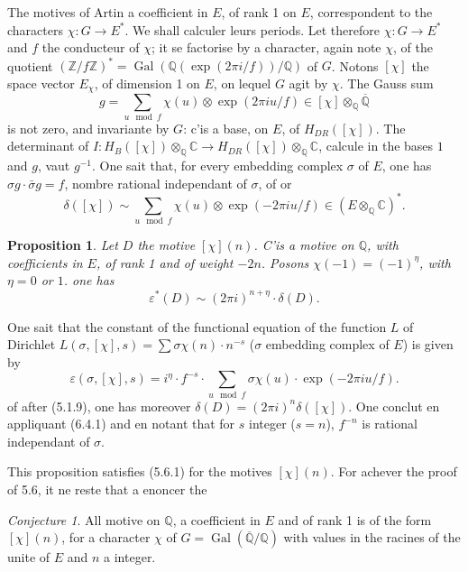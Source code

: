 \documentclass[12pt,a4paper]{article}
\theoremstyle{plain}
\newtheorem{proposition}[theorem]{Proposition}
\theoremstyle{definition}
\theoremstyle{remark}
\newtheorem{conjecture}[definition]{Conjecture}
\DeclareMathOperator{\Gal}{Gal}
\newcommand{\Q}{\mathbb{Q}}
\newcommand{\C}{\mathbb{C}}
\newcommand{\Z}{\mathbb{Z}}
\begin{document}
The motives of Artin a coefficient in $E$, of rank 1 on $E$, correspondent to the
characters $\chi: G \to E^*$. We shall calculer leurs periods. Let therefore
$\chi: G \to E^*$ and $f$ the conducteur of $\chi$; it se factorise by a character, again note
$\chi$, of the quotient $(\Z/f\Z)^* = \Gal(\Q(\exp(2\pi i/f))/\Q)$ of $G$. Notons $[\chi]$ the space
vector $E_\chi$, of dimension 1 on $E$, on lequel $G$ agit by $\chi$. The Gauss sum
\[
g = \sum_{u \mod f} \chi(u) \otimes \exp(2\pi i u/f) \in [\chi] \otimes_\Q \overline{\Q}
\]
is not zero, and invariante by $G$: c'is a base, on $E$, of $H_{DR}([\chi])$. The
determinant of $I: H_B([\chi]) \otimes_\Q \C \to H_{DR}([\chi]) \otimes_\Q \C$, calcule in the bases
$1$ and $g$, vaut $g^{-1}$. One sait that, for every embedding complex $\sigma$ of $E$, one has
$\sigma g \cdot \bar{\sigma} g = f$, nombre rational independant of $\sigma$, of or
\begin{equation}\label{eq:6.4.1}
\delta([\chi]) \sim \sum_{u \mod f} \chi(u) \otimes \exp(-2\pi i u/f) \in (E \otimes_\Q \C)^*.
\end{equation}

\begin{proposition}\label{prop:6.5}
Let $D$ the motive $[\chi](n)$. C'is a motive on $\Q$, with coefficients in $E$, of rank 1
and of weight $-2n$. Posons $\chi(-1) = (-1)^\eta$, with $\eta = 0$ or $1$. one has
\[
\varepsilon^*(D) \sim (2\pi i)^{n + \eta} \cdot \delta(D).
\]
\end{proposition}

One sait that the constant of the functional equation of the function $L$ of Dirichlet
$L(\sigma, [\chi], s) = \sum \sigma\chi(n) \cdot n^{-s}$ ($\sigma$ embedding complex of $E$) is given by
\[
\varepsilon(\sigma, [\chi], s) = i^\eta \cdot f^{-s} \cdot \sum_{u \mod f} \sigma\chi(u) \cdot \exp(-2\pi i u/f).
\]
of after (5.1.9), one has moreover $\delta(D) = (2\pi i)^n \delta([\chi])$. One conclut en appliquant
(6.4.1) and en notant that for $s$ integer ($s = n$), $f^{-n}$ is rational independant of $\sigma$.

This proposition satisfies (5.6.1) for the motives $[\chi](n)$. For achever the proof of
5.6, it ne reste that a enoncer the

\begin{conjecture}\label{conj:6.6}
All motive on $\Q$, a coefficient in $E$ and of rank 1 is of the form $[\chi](n)$, for
a character $\chi$ of $G = \Gal(\overline{\Q}/\Q)$ with values in the racines of the unite of $E$ and
$n$ a integer.
\end{conjecture}
\end{document}
